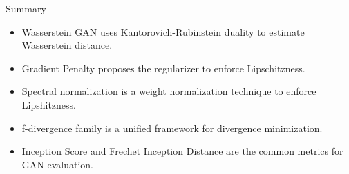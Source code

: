\documentclass{beamer}
\begin{document}
\begin{frame}{Summary}
	\begin{itemize}
		\item Wasserstein GAN uses Kantorovich-Rubinstein duality to estimate Wasserstein distance.
		\item Gradient Penalty proposes the regularizer to enforce Lipschitzness.
		\item Spectral normalization is a weight normalization technique to enforce Lipshitzness.
		\item f-divergence family is a unified framework for divergence minimization.
		\item Inception Score and Frechet Inception Distance are the common metrics for GAN evaluation.
	\end{itemize}
\end{frame}
\end{document}
